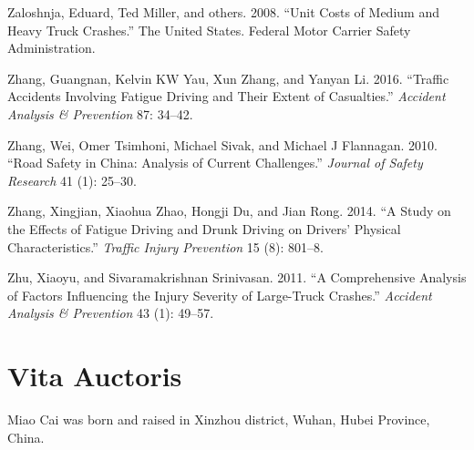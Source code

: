 \documentclass[12pt]{book}
\numberwithin{equation}{chapter}
\begin{document}
\leavevmode\hypertarget{ref-zaloshnja2008unit}{}%
Zaloshnja, Eduard, Ted Miller, and others. 2008. ``Unit Costs of Medium and Heavy Truck Crashes.'' The United States. Federal Motor Carrier Safety Administration.

\leavevmode\hypertarget{ref-zhang2016traffic}{}%
Zhang, Guangnan, Kelvin KW Yau, Xun Zhang, and Yanyan Li. 2016. ``Traffic Accidents Involving Fatigue Driving and Their Extent of Casualties.'' \emph{Accident Analysis \& Prevention} 87: 34--42.

\leavevmode\hypertarget{ref-zhang2010road}{}%
Zhang, Wei, Omer Tsimhoni, Michael Sivak, and Michael J Flannagan. 2010. ``Road Safety in China: Analysis of Current Challenges.'' \emph{Journal of Safety Research} 41 (1): 25--30.

\leavevmode\hypertarget{ref-zhang2014study}{}%
Zhang, Xingjian, Xiaohua Zhao, Hongji Du, and Jian Rong. 2014. ``A Study on the Effects of Fatigue Driving and Drunk Driving on Drivers' Physical Characteristics.'' \emph{Traffic Injury Prevention} 15 (8): 801--8.

\leavevmode\hypertarget{ref-zhu2011comprehensive}{}%
Zhu, Xiaoyu, and Sivaramakrishnan Srinivasan. 2011. ``A Comprehensive Analysis of Factors Influencing the Injury Severity of Large-Truck Crashes.'' \emph{Accident Analysis \& Prevention} 43 (1): 49--57.

\hypertarget{vita-auctoris}{%
\chapter*{Vita Auctoris}\label{vita-auctoris}}

Miao Cai was born and raised in Xinzhou district, Wuhan, Hubei Province, China.







\backmatter
\printindex
\end{document}
